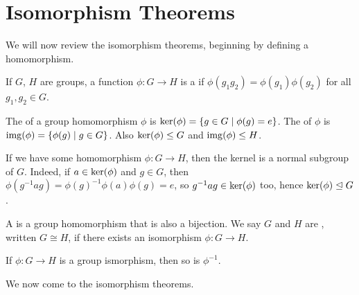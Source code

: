 \documentclass[a4paper]{scrreprt}
\begin{document}
\section{Isomorphism Theorems}

We will now review the isomorphism theorems, beginning by defining a homomorphism.

\begin{definition}
	If $G$, $H$ are groups, a function $\phi: G \rightarrow H$ is a  if
	$
	\phi(g_1 g_2) = \phi(g_1) \phi(g_2)
	$
	for all $g_1, g_2 \in G$.
\end{definition}

\begin{definition}
	The  of a group homomorphism $\phi$ is $\operatorname{ker}(\phi) = \{ g \in G \mid \phi(g) = e\}$.
	The  of $\phi$ is $\operatorname{img}(\phi) = \{ \phi(g) \mid g \in G\}$. Also $\operatorname{ker}(\phi) \leq G$ and $\operatorname{img}(\phi) \leq H$.
\end{definition}



If we have some homomorphism $\phi: G \rightarrow H$, 
then the kernel is a normal subgroup of $G$. Indeed, if $a \in \operatorname{ker}(\phi)$ and $g \in G$, then $\phi(g^{-1}ag) = \phi(g)^{-1} \phi(a) \phi(g) = e$, so $g^{-1}ag \in \operatorname{ker}(\phi)$ too, hence $\operatorname{ker}(\phi) \trianglelefteq G$.

\begin{definition}
	A  is a group homomorphism that is also a bijection. We say $G$ and $H$ are , written $G \cong H$, if there exists an isomorphism $\phi:G \rightarrow H$.
\end{definition}

\begin{remark}
	If $\phi:G \rightarrow H$ is a group ismorphism, then so is $\phi^{-1}$.
\end{remark}

We now come to the isomorphism theorems.
\end{document}
